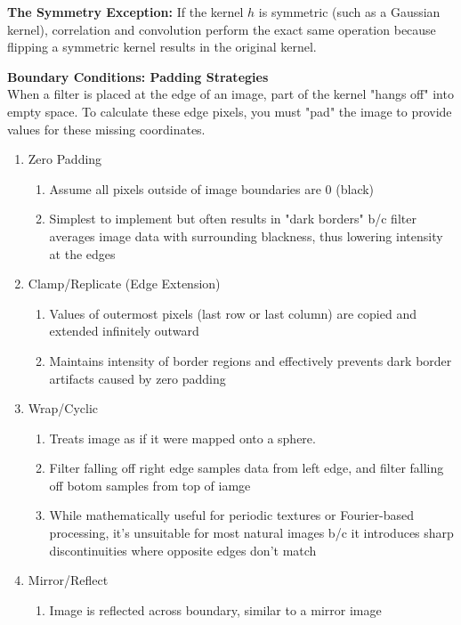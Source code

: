 \documentclass[12pt]{article}
\begin{document}
\textbf{The Symmetry Exception:} If the kernel $h$ is symmetric (such as a Gaussian kernel), correlation and convolution perform the exact same operation because flipping a symmetric kernel results in the original kernel.

\textbf{Boundary Conditions: Padding Strategies}\\
When a filter is placed at the edge of an image, part of the kernel "hangs off" into empty space. To calculate these edge pixels, you must "pad" the image to provide values for these missing coordinates.

\begin{enumerate}
    \item Zero Padding
          \begin{enumerate}
              \item Assume all pixels outside of image boundaries are 0 (black)
              \item Simplest to implement but often results in "dark borders" b/c filter averages image data with surrounding blackness, thus lowering intensity at the edges
          \end{enumerate}
    \item Clamp/Replicate (Edge Extension)
          \begin{enumerate}
              \item Values of outermost pixels (last row or last column) are copied and extended infinitely outward
              \item Maintains intensity of border regions and effectively prevents dark border artifacts caused by zero padding
          \end{enumerate}
    \item Wrap/Cyclic
          \begin{enumerate}
              \item Treats image as if it were mapped onto a sphere.
              \item Filter falling off right edge samples data from left edge, and filter falling off botom samples from top of iamge
              \item While mathematically useful for periodic textures or Fourier-based processing, it's unsuitable for most natural images b/c it introduces sharp discontinuities where opposite edges don't match
          \end{enumerate}
    \item Mirror/Reflect
          \begin{enumerate}
              \item Image is reflected across boundary, similar to a mirror image

\end{enumerate}
\end{enumerate}
\end{document}
